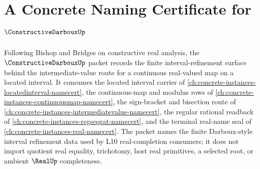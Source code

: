 \chapter{A Concrete Naming Certificate for $\ConstructiveDarbouxUp$}
\label{ch:concrete-instances-constructive-darboux-namecert}

Following Bishop and Bridges on constructive real analysis, the $\ConstructiveDarbouxUp$ packet records the finite interval-refinement surface behind the intermediate-value route for a continuous real-valued map on a located interval. It consumes the located interval carrier of \autoref{ch:concrete-instances-locatedinterval-namecert}, the continuous-map and modulus rows of \autoref{ch:concrete-instances-continuousmap-namecert}, the sign-bracket and bisection route of \autoref{ch:concrete-instances-intermediatevalue-namecert}, the regular rational readback of \autoref{ch:concrete-instances-regseqrat-namecert}, and the terminal real-name seal of \autoref{ch:concrete-instances-real-namecert}. The packet names the finite Darboux-style interval refinement data used by L10 real-completion consumers; it does not import quotient real equality, trichotomy, host real primitives, a selected root, or ambient $\RealUp$ completeness.

